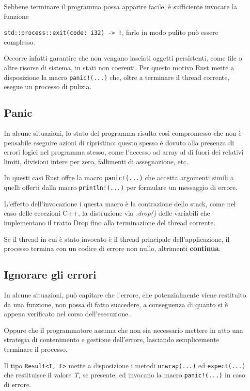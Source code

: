 Sebbene terminare il programma possa apparire facile, è sufficiente invocare la
funzione

\texttt{std::process::exit(code: i32) -> !}, farlo in modo pulito può
essere complesso.

Occorre infatti garantire che non vengano lasciati oggetti persistenti, come
file o altre risorse di sistema, in stati non coerenti. Per questo motivo
Rust mette a disposizione la macro \texttt{panic!(...)} che, oltre a terminare il
thread corrente, esegue un processo di pulizia.

\subsection{Panic}
In alcune situazioni, lo stato del programma risulta così compromesso che non è
pensabile eseguire azioni di ripristino: questo spesso è dovuto alla presenza di
errori logici nel programma stesso, come l'accesso ad array al di fuori dei relativi
limiti, divisioni intere per zero, fallimenti di assegnazione, etc.\newline

In questi casi Rust offre la macro \texttt{panic!(...)} che accetta
argomenti simili a quelli offerti dalla macro \texttt{println!(...)}
per formulare un messaggio di errore.

L'effetto dell'invocazione i questa macro è la contrazione dello stack, come nel
caso delle eccezioni C++, la distruzione via \textit{.drop()} delle variabili che
implementano il tratto Drop fino alla terminazione del thread corrente.

Se il thread in cui è stato invocato è il thread principale dell'applicazione,
il processo termina con un codice di errore non nullo, altrimenti \textbf{continua}.

\subsection{Ignorare gli errori}
In alcune situazioni, può capitare che l'errore, che potenzialmente viene
restituito da una funzione, non possa di fatto succedere, a conseguenza di quanto
si è appena verificato nel corso dell'esecuzione.

Oppure che il programmatore assuma che non sia necessario mettere in atto una
strategia di contenimento e gestione dell'errore, lasciando semplicemente
terminare il processo.

Il tipo \texttt{Result<T, E>} mette a disposizione i metodi
\texttt{unwrap(...)} ed \texttt{expect(...)} che restituisce
il valore \textit{T}, se presente, ed invocano la macro \texttt{panic!(...)}
in caso di errore.

